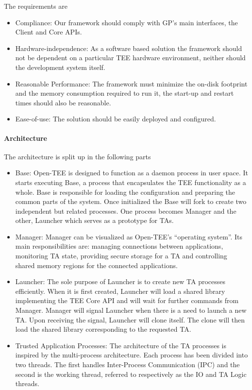 \documentclass{article}
\begin{document}
The requirements are \begin{itemize}
\item Compliance: Our framework should comply with GP’s main interfaces, the Client and Core APIs.
\item Hardware-independence: As a software based solution the framework should not be dependent on a particular TEE hardware environment, neither should the development system itself.
\item Reasonable Performance: The framework must minimize the on-disk footprint and the memory consumption required to run it, the start-up and restart times should also be reasonable.
\item Ease-of-use: The solution should be easily deployed and configured.
\end{itemize}

\paragraph{Architecture}

The architecture is split up in the following parts \begin{itemize}
\item Base: Open-TEE is designed to function as a daemon process in user space. It starts executing Base, a process that encapsulates the TEE functionality as a whole. Base is responsible for loading the configuration and preparing the common parts of the system. Once initialized the Base will fork to create two independent but related processes. One process becomes Manager and the other, Launcher which serves as a prototype for TAs.
\item Manager: Manager can be visualized as Open-TEE’s “operating system”. Its main responsibilities are: managing connections between applications, monitoring TA state, providing secure storage for a TA and controlling shared memory regions for the connected applications.
\item Launcher: The sole purpose of Launcher is to create new TA processes efficiently. When it is first created, Launcher will load a shared library implementing the TEE Core API and will wait for further commands from Manager. Manager will signal Launcher when there is a need to launch a new TA. Upon receiving the signal, Launcher will clone itself. The clone will then load the shared library corresponding to the requested TA.
\item Trusted Application Processes: The architecture of the TA processes is inspired by the multi-process architecture. Each process has been divided into two threads. The first handles Inter-Process Communication (IPC) and the second is the working thread, referred to respectively as the IO and TA Logic threads.
\end{itemize}
\end{document}
